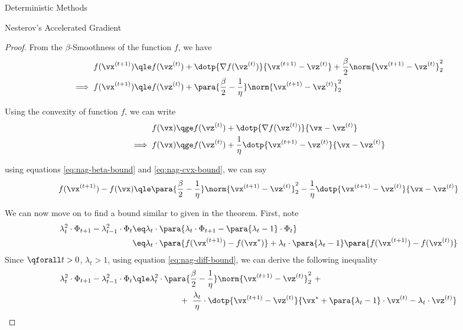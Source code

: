 \documentclass{article}
\newcommand{\x}[1]{\vx^{(#1)}}
\newcommand{\xs}{\vx^{\ast}}
\newcommand{\z}[1]{\vz^{(#1)}}
\newcommand{\f}[1]{f(\vx^{(#1)})}
\newcommand{\fs}{f(\vx^\ast)}
\newcommand{\fz}[1]{f(\z{#1})}
\newcommand{\gfz}[1]{\nabla \fz{#1}}
\begin{document}
\begin{psection}{Deterministic Methods}
\begin{psubsection}{Nesterov's Accelerated Gradient}
\begin{theorem}
			\begin{proof}
				From the $\beta$-Smoothness of the function $f$, we have
				\begin{align}
					\f{t+1}	&\qle	\fz{t} + \dotp{\gfz{t}}{\x{t+1} - \z{t}} + \frac{\beta}{2} \norm{\x{t+1} - \z{t}}_2^2 \nonumber \\
					\implies \f{t+1}	&\qle	\fz{t} + \para{\frac{\beta}{2} - \frac{1}{\eta}} \norm{\x{t + 1} - \z{t}}_2^2 \label{eq:nag-beta-bound}
				\end{align}

				Using the convexity of function $f$, we can write
				\begin{align}
					f(\vx)	&\qge	\fz{t} + \dotp{\gfz{t}}{\vx - \z{t}} \nonumber \\
					\implies f(\vx)	&\qge	\fz{t} + \frac{1}{\eta} \dotp{\x{t+1} - \z{t}}{\vx - \z{t}} \label{eq:nag-cvx-bound}
				\end{align}

				using equations \ref{eq:nag-beta-bound} and \ref{eq:nag-cvx-bound}, we can say
				\begin{align}
					\f{t + 1} - f(\vx)	\qle	\para{\frac{\beta}{2} - \frac{1}{\eta}} \norm{\x{t + 1} - \z{t}}_2^2 - \frac{1}{\eta} \dotp{\x{t+1} - \z{t}}{\vx - \z{t}}
					\label{eq:nag-diff-bound}
				\end{align}

				We can now move on to find a bound similar to given in the theorem. First, note
				\begin{align*}
					\lambda_t^2 \cdot \Phi_{t + 1} - \lambda_{t - 1}^2 \cdot \Phi_{t}	&\eq	\lambda_t \cdot \para{\lambda_t \cdot \Phi_{t + 1} - \para{\lambda_t - 1} \cdot \Phi_t} \\
					&\eq	\lambda_t \cdot \para{\f{t + 1} - \fs} + \lambda_t \cdot \para{\lambda_t - 1} \para{\f{t + 1} - \f{t}}
				\end{align*}
				Since $\qforall t > 0$, $\lambda_t > 1$, using equation \ref{eq:nag-diff-bound}, we can derive the following inequality
				\begin{align*}
					\lambda_t^2 \cdot \Phi_{t + 1} - \lambda_{t - 1}^2 \cdot \Phi_{t}	&\qle	\lambda_t^2 \cdot \para{\frac{\beta}{2} - \frac{1}{\eta}} \norm{\x{t + 1} - \z{t}}_2^2 \ + \\
					&\hspace{2cm} + \ \frac{\lambda_t}{\eta} \cdot \dotp{\x{t+1} - \z{t}}{\xs + \para{\lambda_t - 1} \cdot \x{t} - \lambda_t \cdot \z{t}}
				\end{align*}


\end{proof}
\end{theorem}
\end{psubsection}
\end{psection}
\end{document}
